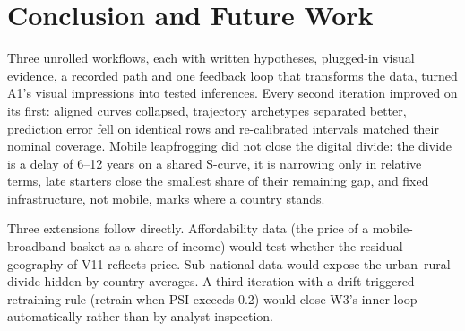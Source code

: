 \documentclass[conference,a4paper]{IEEEtran}
\begin{document}
\section{Conclusion and Future Work}
Three unrolled workflows, each with written hypotheses, plugged-in visual evidence, a recorded path and
one feedback loop that transforms the data, turned A1's visual impressions into tested inferences.
Every second iteration improved on its first: aligned curves collapsed, trajectory archetypes separated
better, prediction error fell on identical rows and re-calibrated intervals matched their nominal
coverage. Mobile leapfrogging did not close the digital divide: the divide is a delay of 6--12 years on
a shared S-curve, it is narrowing only in relative terms, late starters close the smallest share of
their remaining gap, and fixed infrastructure, not mobile, marks where a country stands.

Three extensions follow directly. Affordability data (the price of a mobile-broadband basket as a
share of income) would test whether the residual geography of V11 reflects price. Sub-national data
would expose the urban--rural divide hidden by country averages. A third iteration with a
drift-triggered retraining rule (retrain when PSI exceeds 0.2) would close W3's inner loop
automatically rather than by analyst inspection.

\end{document}
